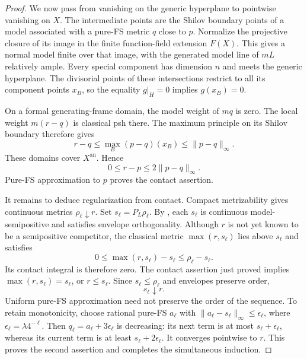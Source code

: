 \documentclass[11pt,reqno]{amsart}
\theoremstyle{definition}
\theoremstyle{remark}
\numberwithin{equation}{section}
\newcommand{\an}{\mathrm{an}}
\begin{document}
\begin{proof}
We now pass from vanishing on the generic hyperplane to pointwise
vanishing on $X$. The intermediate points are the Shilov boundary
points of a model associated with a pure-FS metric $q$ close to $p$.
Normalize the projective closure of its image in the finite
function-field extension \(F(X)\). This gives a normal model
finite over that image, with the generated model line of \(mL\)
relatively ample. Every special component has dimension \(n\)
and meets the generic hyperplane. The divisorial points of these
intersections restrict to all its component points \(x_B\), so
the equality \(g|_H=0\) implies \(g(x_B)=0\).

On a formal generating-frame domain, the model weight of \(mq\)
is zero. The local weight \(m(r-q)\) is classical psh there.
The maximum principle on its Shilov boundary
\cite[Theorem~6.4 and Remark~7.5]{GR} therefore gives
\[
 r-q\leq\max_B(p-q)(x_B)\leq\|p-q\|_\infty.
\]
These domains cover \(X^{\an}\). Hence
\[
 0\leq r-p\leq2\|p-q\|_\infty.
\]
Pure-FS approximation to \(p\) proves the contact assertion.

It remains to deduce regularization from contact. Compact
metrizability gives continuous metrics $\rho_\ell\downarrow r$.
Set $s_\ell=P_L\rho_\ell$. By , each
$s_\ell$ is continuous model-semipositive and satisfies envelope
orthogonality. Although $r$ is not yet known to be a semipositive
competitor, the classical metric $\max(r,s_\ell)$ lies above $s_\ell$
and satisfies
\[
 0\leq\max(r,s_\ell)-s_\ell\leq\rho_\ell-s_\ell.
\]
Its contact integral is therefore zero. The contact assertion just
proved implies $\max(r,s_\ell)=s_\ell$, or $r\leq s_\ell$.
Since \(s_\ell\leq\rho_\ell\) and envelopes preserve order,
\[
 s_\ell\downarrow r.
\]
Uniform pure-FS approximation need not preserve the order of the
sequence. To retain monotonicity, choose rational pure-FS $a_\ell$ with
\(\|a_\ell-s_\ell\|_\infty\leq\epsilon_\ell\), where
\(\epsilon_\ell=\lambda4^{-\ell}\).
Then \(q_\ell=a_\ell+3\epsilon_\ell\) is decreasing: its next
term is at most \(s_\ell+\epsilon_\ell\), whereas its current
term is at least \(s_\ell+2\epsilon_\ell\).
It converges pointwise to \(r\). This proves the second assertion
and completes the simultaneous induction.
\end{proof}
\end{document}
